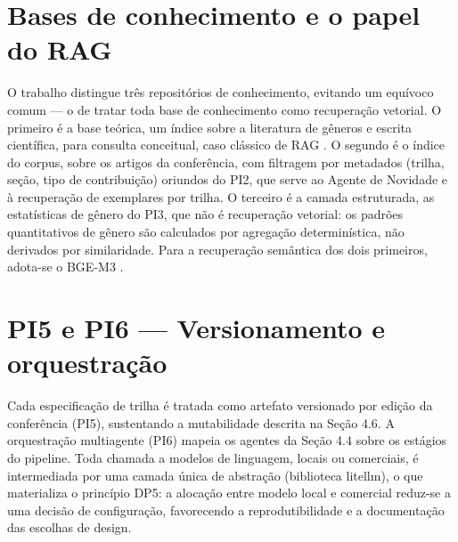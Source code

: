 \section{Bases de conhecimento e o papel do RAG}

O trabalho distingue três repositórios de conhecimento, evitando um equívoco comum — o de tratar toda base de conhecimento como recuperação vetorial. O primeiro é a base teórica, um índice sobre a literatura de gêneros e escrita científica, para consulta conceitual, caso clássico de RAG \cite{RAG}. O segundo é o índice do corpus, sobre os artigos da conferência, com filtragem por metadados (trilha, seção, tipo de contribuição) oriundos do PI2, que serve ao Agente de Novidade e à recuperação de exemplares por trilha. O terceiro é a camada estruturada, as estatísticas de gênero do PI3, que não é recuperação vetorial: os padrões quantitativos de gênero são calculados por agregação determinística, não derivados por similaridade. Para a recuperação semântica dos dois primeiros, adota-se o BGE-M3 \cite{BGEM3}.

\section{PI5 e PI6 — Versionamento e orquestração}

Cada especificação de trilha é tratada como artefato versionado por edição da conferência (PI5), sustentando a mutabilidade descrita na Seção 4.6. A orquestração multiagente (PI6) mapeia os agentes da Seção 4.4 sobre os estágios do pipeline. Toda chamada a modelos de linguagem, locais ou comerciais, é intermediada por uma camada única de abstração (biblioteca litellm), o que materializa o princípio DP5: a alocação entre modelo local e comercial reduz-se a uma decisão de configuração, favorecendo a reprodutibilidade e a documentação das escolhas de design.

